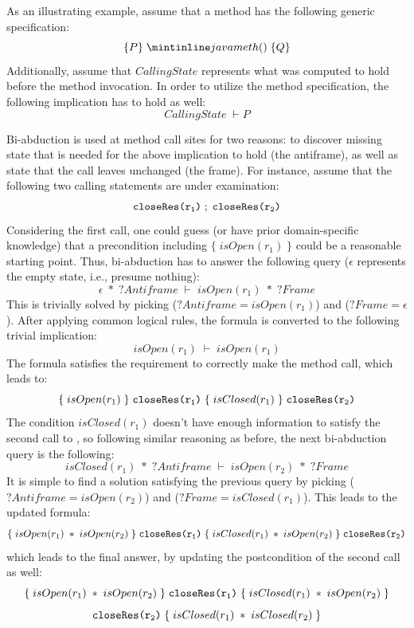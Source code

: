 As an illustrating example, assume that a method has the following generic specification:
\[
\{ P \} \; \code{meth()} \; \{ Q \}
\]
Additionally, assume that $CallingState$ represents what was computed to hold before the method invocation. In order to utilize the method specification, the following implication has to hold as well:
\[
CallingState \; \vdash P
\]

Bi-abduction is used at method call sites for two reasons: to discover missing state that is needed for the above implication to hold (the antiframe), as well as state that the call leaves unchanged (the frame). For instance, assume that the following two calling statements are under examination:
\[
\texttt{closeRes(r\textsubscript{1})} \; ; \; \texttt{closeRes(r\textsubscript{2})}
\]
Considering the first call, one could guess (or have prior domain-specific knowledge) that a precondition including $\{\; isOpen(r_1) \;\}$ could be a reasonable starting point. Thus, bi-abduction has to answer the following query ($\epsilon$ represents the empty state, i.e., presume nothing):
\[
\epsilon \; * \; ?Antiframe \; \vdash \; isOpen(r_1) \; * \; ?Frame
\]
This is trivially solved by picking ($?Antiframe = isOpen(r_1)$) and ($?Frame = \epsilon$). After applying common logical rules, the formula is converted to the following trivial implication:
\[
isOpen(r_1) \; \vdash \; isOpen(r_1)
\]
The formula satisfies the requirement to correctly make the method call, which leads to:
\[
\{ \; isOpen(r_1) \; \} \; \texttt{closeRes(r\textsubscript{1})} \; \{ \; isClosed(r_1) \; \} \; \texttt{closeRes(r\textsubscript{2})}
\]
The condition $isClosed(r_1)$ doesn't have enough information to satisfy the second call to , so following similar reasoning as before, the next bi-abduction query is the following:
\[
isClosed(r_1) \; * \; ?Antiframe \; \vdash \; isOpen(r_2) \; * \; ?Frame
\]
It is simple to find a solution satisfying the previous query by picking ($?Antiframe = isOpen(r_2)$) and ($?Frame = isClosed(r_1)$). This leads to the updated formula:
\[
\{ \; isOpen(r_1) \; * \; isOpen(r_2) \; \} \; \texttt{closeRes(r\textsubscript{1})} \; \{ \; isClosed(r_1) \; * \; isOpen(r_2) \; \} \; \texttt{closeRes(r\textsubscript{2})}
\]
which leads to the final answer, by updating the postcondition of the second call as well:
\[
\{ \; isOpen(r_1) \; * \; isOpen(r_2) \; \} \; \texttt{closeRes(r\textsubscript{1})} \; \{ \; isClosed(r_1) \; * \; isOpen(r_2) \; \}
\]
\[
\texttt{closeRes(r\textsubscript{2})} \; \{ \; isClosed(r_1) \; * \; isClosed(r_2) \; \}
\]




